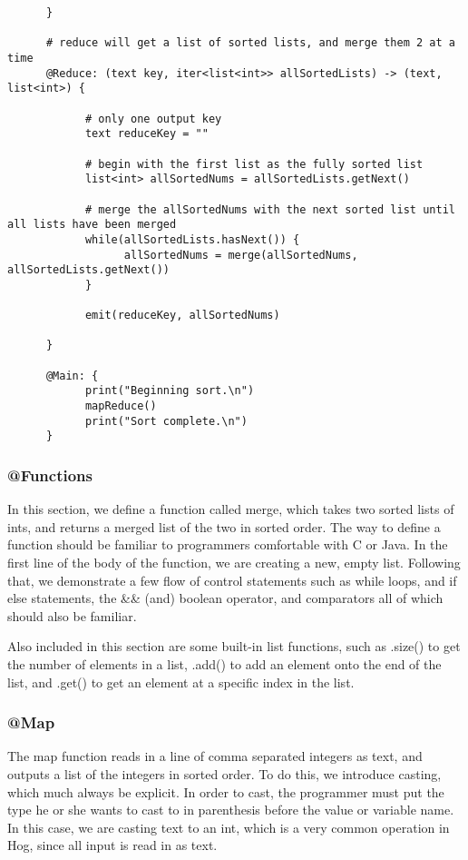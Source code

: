 \documentclass{article}
\begin{document}
\begin{verbatim}
      }
      
      # reduce will get a list of sorted lists, and merge them 2 at a time
      @Reduce: (text key, iter<list<int>> allSortedLists) -> (text, list<int>) {
            
            # only one output key
            text reduceKey = ""
            
            # begin with the first list as the fully sorted list 
            list<int> allSortedNums = allSortedLists.getNext()
            
            # merge the allSortedNums with the next sorted list until all lists have been merged
            while(allSortedLists.hasNext()) {
                  allSortedNums = merge(allSortedNums, allSortedLists.getNext())
            }
            
            emit(reduceKey, allSortedNums)
            
      }
      
      @Main: {
            print("Beginning sort.\n")
            mapReduce()
            print("Sort complete.\n")
      }

\end{verbatim}

\subsubsection*{@Functions}
In this section, we define a function called merge, which takes two sorted lists of ints, and returns a merged list of the two in sorted order. The way to define a function should be familiar to programmers comfortable with C or Java. In the first line of the body of the function, we are creating a new, empty list. Following that, we demonstrate a few flow of control statements such as while loops, and if else statements, the \&\& (and) boolean operator, and comparators all of which should also be familiar. 

Also included in this section are some built-in list functions, such as .size() to get the number of elements in a list, .add() to add an element onto the end of the list, and .get() to get an element at a specific index in the list.

\subsubsection*{@Map}
The map function reads in a line of comma separated integers as text, and outputs a list of the integers in sorted order. To do this, we introduce casting, which much always be explicit. In order to cast, the programmer must put the type he or she wants to cast to in parenthesis before the value or variable name. In this case, we are casting text to an int, which is a very common operation in Hog, since all input is read in as text.
\end{document}
